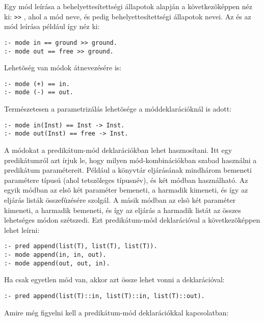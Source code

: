 Egy mód leírása a behelyettesítettségi állapotok alapján a következõképpen néz ki:
  \cd{==}  \verb`>>` , ahol
 a mód neve,  és  pedig behelyettesítettségi állapotok
nevei. Az  és az  mód leírása például így néz ki:

\begin{verbatim}
:- mode in == ground >> ground.
:- mode out == free >> ground.
\end{verbatim}

Lehetõség van módok átnevezésére is:   \cd{==} 

\begin{verbatim}
:- mode (+) == in.
:- mode (-) == out.
\end{verbatim}

Természetesen a parametrizálás lehetõsége a móddeklarációknál is adott:

\begin{verbatim}
:- mode in(Inst) == Inst -> Inst.
:- mode out(Inst) == free -> Inst.
\end{verbatim}

A módokat a predikátum-mód deklarációkban lehet hasznosítani. Itt egy predikátumról
azt írjuk le, hogy milyen mód-kombinációkban szabad használni a predikátum paramétereit.
Például a  könyvtár  eljárásának mindhárom bemeneti paramétere
 típusú (ahol  tetszõleges típusnév), és két módban használható.
Az egyik módban az elsõ két paraméter bemeneti, a harmadik kimeneti, és így az
eljárás listák összefûzésére szolgál. A másik módban az elsõ két paraméter kimeneti,
a harmadik bemeneti, és így az eljárás a harmadik listát az összes lehetséges módon
szétszedi. Ezt predikátum-mód deklarációval a következõképpen lehet leírni:

\begin{verbatim}
:- pred append(list(T), list(T), list(T)).
:- mode append(in, in, out).
:- mode append(out, out, in).
\end{verbatim}

Ha csak egyetlen mód van, akkor azt össze lehet vonni a  deklarációval:

\begin{verbatim}
:- pred append(list(T)::in, list(T)::in, list(T)::out).
\end{verbatim}

Amire még figyelni kell a predikátum-mód deklarációkkal kapcsolatban:

